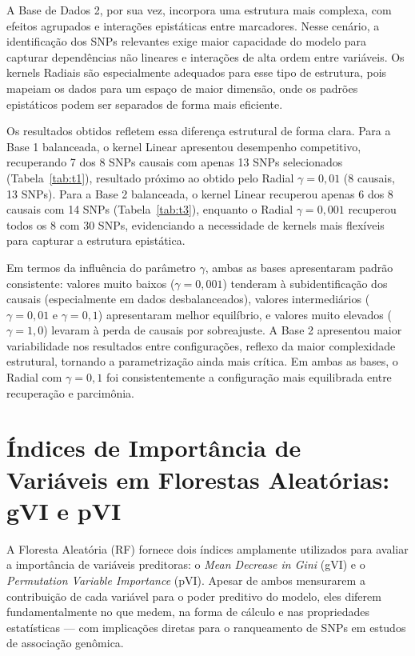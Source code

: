 \documentclass[
    12pt,
    a4paper,
    oneside,
    english,
    french,
    spanish,
    brazil
    ]{abntex2}
\newcommand{\novo}[1]{\textcolor{corNova}{#1}}
\begin{document}
\novo{A Base de Dados 2, por sua vez, incorpora uma estrutura mais complexa, com efeitos agrupados e interações epistáticas entre marcadores. Nesse cenário, a identificação dos SNPs relevantes exige maior capacidade do modelo para capturar dependências não lineares e interações de alta ordem entre variáveis. Os kernels Radiais são especialmente adequados para esse tipo de estrutura, pois mapeiam os dados para um espaço de maior dimensão, onde os padrões epistáticos podem ser separados de forma mais eficiente.}

\novo{Os resultados obtidos refletem essa diferença estrutural de forma clara. Para a Base 1 balanceada, o kernel Linear apresentou desempenho competitivo, recuperando 7 dos 8 SNPs causais com apenas 13 SNPs selecionados (Tabela~\ref{tab:t1}), resultado próximo ao obtido pelo Radial $\gamma = 0{,}01$ (8 causais, 13 SNPs). Para a Base 2 balanceada, o kernel Linear recuperou apenas 6 dos 8 causais com 14 SNPs (Tabela~\ref{tab:t3}), enquanto o Radial $\gamma = 0{,}001$ recuperou todos os 8 com 30 SNPs, evidenciando a necessidade de kernels mais flexíveis para capturar a estrutura epistática.}

\novo{Em termos da influência do parâmetro $\gamma$, ambas as bases apresentaram padrão consistente: valores muito baixos ($\gamma = 0{,}001$) tenderam à subidentificação dos causais (especialmente em dados desbalanceados), valores intermediários ($\gamma = 0{,}01$ e $\gamma = 0{,}1$) apresentaram melhor equilíbrio, e valores muito elevados ($\gamma = 1{,}0$) levaram à perda de causais por sobreajuste. A Base 2 apresentou maior variabilidade nos resultados entre configurações, reflexo da maior complexidade estrutural, tornando a parametrização ainda mais crítica. Em ambas as bases, o Radial com $\gamma = 0{,}1$ foi consistentemente a configuração mais equilibrada entre recuperação e parcimônia.}

\chapter{Índices de Importância de Variáveis em Florestas Aleatórias: gVI e pVI}
\label{cap:gvi_pvi}

\novo{A Floresta Aleatória (RF) fornece dois índices amplamente utilizados para avaliar a importância de variáveis preditoras: o \textit{Mean Decrease in Gini} (gVI) e o \textit{Permutation Variable Importance} (pVI). Apesar de ambos mensurarem a contribuição de cada variável para o poder preditivo do modelo, eles diferem fundamentalmente no que medem, na forma de cálculo e nas propriedades estatísticas --- com implicações diretas para o ranqueamento de SNPs em estudos de associação genômica.}
\end{document}
